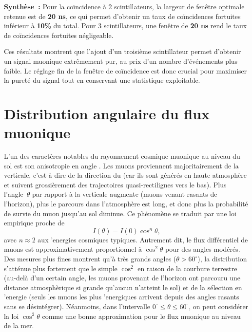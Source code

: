 \documentclass[a4paper,12pt,twoside]{article}
\begin{document}

\begin{remarque}
\textbf{Synthèse~:} Pour la coïncidence à 2 scintillateurs, la largeur de fenêtre optimale retenue est de \textbf{20 ns}, ce qui permet d’obtenir un taux de coïncidences fortuites inférieur à \textbf{10\%} du total. Pour 3 scintillateurs, une fenêtre de \textbf{20 ns} rend le taux de coïncidences fortuites négligeable.

Ces résultats montrent que l’ajout d’un troisième scintillateur permet d’obtenir un signal muonique extrêmement pur, au prix d’un nombre d’événements plus faible. Le réglage fin de la fenêtre de coïncidence est donc crucial pour maximiser la pureté du signal tout en conservant une statistique exploitable.
\end{remarque}



\section{Distribution angulaire du flux muonique}
L'un des caract\`eres notables du rayonnement cosmique muonique au niveau du sol est son anisotropie en angle . Les muons proviennent majoritairement de la verticale, c'est-\`a-dire de la direction du  (car ils sont g\'en\'er\'es en haute atmosph\`ere et suivent grossi\`erement des trajectoires quasi-rectilignes vers le bas). Plus l'angle~$\theta$ par rapport \`a la verticale augmente (muons venant rasants de l'horizon), plus le parcours dans l'atmosph\`ere est long, et donc plus la probabilit\'e de survie du muon jusqu'au sol diminue. Ce ph\'enom\`ene se traduit par une loi empirique proche de
\[
  I(\theta) = I(0)\cos^n\theta,
\]
avec $n \approx 2$ aux 'energies cosmiques typiques. Autrement dit, le flux diff\'erentiel de muons est approximativement proportionnel \`a $\cos^2\theta$ pour des angles mod\'er\'es. Des mesures plus fines montrent qu'\`a tr\`es grands angles ($\theta > 60^\circ$), la distribution s'att\'enue plus fortement que le simple $\cos^2$ en raison de la courbure terrestre (au-del\`a d'un certain angle, les muons provenant de l'horizon ont parcouru une distance atmosph\`erique si grande qu'aucun n'atteint le sol) et de la s\'election en 'energie (seuls les muons les plus 'energiques arrivent depuis des angles rasants sans se d\'esint\'egrer). N\'eanmoins, dans l'intervalle $0^\circ \le \theta \leq 60^\circ$, on peut consid\'erer la loi $\cos^2\theta$ comme une bonne approximation pour le flux muonique au niveau de la mer.
\end{document}
